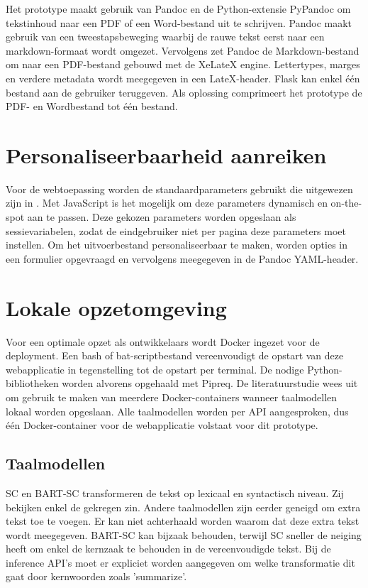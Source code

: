 Het prototype maakt gebruik van Pandoc en de Python-extensie PyPandoc om tekstinhoud naar een PDF of een Word-bestand uit te schrijven. Pandoc maakt gebruik van een tweestapsbeweging waarbij de rauwe tekst eerst naar een markdown-formaat wordt omgezet. Vervolgens zet Pandoc de Markdown-bestand om naar een PDF-bestand gebouwd met de XeLateX engine. Lettertypes, marges en verdere metadata wordt meegegeven in een LateX-header. Flask kan enkel één bestand aan de gebruiker teruggeven. Als oplossing comprimeert het prototype de PDF- en Wordbestand tot één bestand. 

\section{Personaliseerbaarheid aanreiken}

Voor de webtoepassing worden de standaardparameters gebruikt die uitgewezen zijn in \textcite{Rello2013a, Rello2013b}. Met JavaScript is het mogelijk om deze parameters dynamisch en on-the-spot aan te passen. Deze gekozen parameters worden opgeslaan als sessievariabelen, zodat de eindgebruiker niet per pagina deze parameters moet instellen. Om het uitvoerbestand personaliseerbaar te maken, worden opties in een formulier opgevraagd en vervolgens meegegeven in de Pandoc YAML-header.

\section{Lokale opzetomgeving}

Voor een optimale opzet als ontwikkelaars wordt Docker ingezet voor de deployment. Een bash of bat-scriptbestand vereenvoudigt de opstart van deze webapplicatie in tegenstelling tot de opstart per terminal. De nodige Python-bibliotheken worden alvorens opgehaald met Pipreq. De literatuurstudie wees uit om gebruik te maken van meerdere Docker-containers wanneer taalmodellen lokaal worden opgeslaan. Alle taalmodellen worden per API aangesproken, dus één Docker-container voor de webapplicatie volstaat voor dit prototype.

\subsection{Taalmodellen}

SC en BART-SC transformeren de tekst op lexicaal en syntactisch niveau. Zij bekijken enkel de gekregen zin. Andere taalmodellen zijn eerder geneigd om extra tekst toe te voegen. Er kan niet achterhaald worden waarom dat deze extra tekst wordt meegegeven.
BART-SC kan bijzaak behouden, terwijl SC sneller de neiging heeft om enkel de kernzaak te behouden in de vereenvoudigde tekst. Bij de inference API's moet er expliciet worden aangegeven om welke transformatie dit gaat door kernwoorden zoals 'summarize'.

